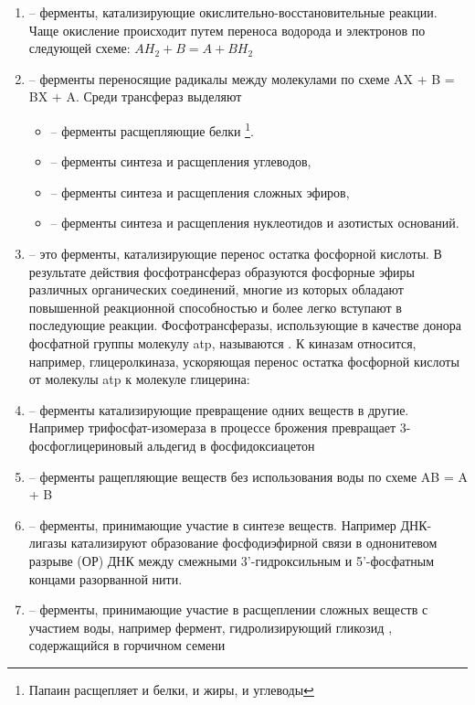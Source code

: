 \begin{enumerate}

\item {} -- ферменты, катализирующие окислительно-восстановительные реакции. Чаще окисление происходит путем переноса водорода и электронов по следующей схеме: $AH_{2} + B = A + BH_{2}$ 


\item {} -- ферменты переносящие радикалы между молекулами по схеме AX + B = BX + A. Среди трансфераз выделяют 
	
	\begin{itemize}
	
	\item {} -- ферменты расщепляющие белки  \footnote{Папаин расщепляет и белки, и жиры, и углеводы}. 
	\item {} -- ферменты синтеза и расщепления углеводов, 
	\item {} -- ферменты синтеза и расщепления сложных эфиров,
	\item {} -- ферменты синтеза и расщепления нуклеотидов и азотистых оснований.

	\end{itemize}

\item {} -- это ферменты, катализирующие перенос остатка фосфорной кислоты. В результате действия фосфотрансфераз образуются фосфорные эфиры различных органических соединений, многие из которых обладают повышенной реакционной способностью и более легко вступают в последующие реакции.  Фосфотрансферазы, использующие в качестве донора фосфатной группы молекулу \gls{atp}, называются . К киназам относится, например, глицеролкиназа, ускоряющая перенос остатка фосфорной кислоты от молекулы \gls{atp} к молекуле глицерина: 
 

\item {} -- ферменты катализирующие превращение одних веществ в другие. Например трифосфат-изомераза в процессе брожения превращает 3-фосфоглицериновый альдегид в  фосфидоксиацетон

\item {} -- ферменты ращепляющие веществ без использования воды по схеме AB = A + B

\item {} -- ферменты, принимающие участие в синтезе веществ. Например ДНК-лигазы катализируют образование фосфодиэфирной связи в однонитевом разрыве (ОР) ДНК между смежными 3’-гидроксильным и 5’-фосфатным концами разорванной нити. 

\item {} -- ферменты, принимающие участие в расщеплении сложных веществ с участием воды, например фермент, гидролизирующий гликозид , содержащийся в горчичном семени

\end{enumerate}

